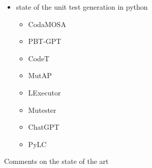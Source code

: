 \documentclass[%
  chapterprefix=false,%
  open=right,%
  twoside=true,%
  paper=a4,%
  logofile={Figures/logo.png},%
  thesistype=master,%
  UKenglish,%
]{se2thesis}
\begin{document}
\begin{itemize}
  \item state of the unit test generation in python
  \begin{itemize}
    \item CodaMOSA~\cite{DBLP:conf/icse/LemieuxILS23}
    \item PBT-GPT~\cite{DBLP:journals/corr/abs-2307-04346}
    \item CodeT~\cite{DBLP:journals/corr/abs-2207-10397}
    \item MutAP~\cite{DBLP:journals/corr/abs-2308-16557}
    \item LExecutor~\cite{DBLP:journals/corr/abs-2302-02343}
    \item Mutester~\cite{DBLP:journals/corr/abs-2307-00404}
    \item ChatGPT~\cite{li2023nuances}
    \item PyLC~\cite{DBLP:conf/sac/SalariEAS23}
  \end{itemize}
\end{itemize}

Comments on the state of the art

\backmatter{}

\printbibliography{}
\end{document}
